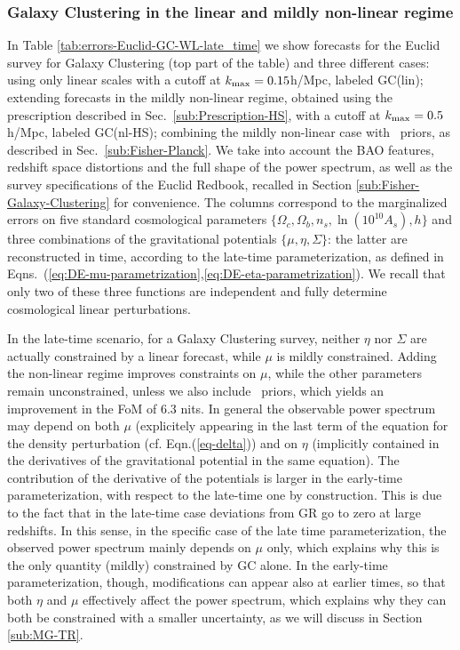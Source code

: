 \subsubsection{Galaxy Clustering in the linear and mildly non-linear regime}
In Table \ref{tab:errors-Euclid-GC-WL-late_time} we show forecasts for the Euclid survey \cite{laureijs_euclid_2011} for Galaxy Clustering (top part of the table) and three different cases: using only linear scales with a cutoff at $k_{\rm max}=0.15$h/Mpc, labeled GC(lin); extending forecasts in the mildly non-linear regime, obtained using the prescription described in Sec.\ \ref{sub:Prescription-HS}, with a cutoff at $k_{\rm max}=0.5$ h/Mpc, labeled GC(nl-HS); combining the mildly non-linear case with \planck\ priors, as described in Sec.\ \ref{sub:Fisher-Planck}. We take into account
the BAO features, redshift space distortions and the full shape of
the power spectrum, as well as the survey specifications of the Euclid Redbook, recalled
in Section \ref{sub:Fisher-Galaxy-Clustering} for convenience. The columns correspond to the marginalized errors on five standard cosmological parameters $\{\Omega_c, \Omega_b, n_s, \ln (10^{10} A_s), h\}$ and three combinations of the gravitational potentials $\{\mu, \eta, \Sigma\}$: the latter are reconstructed in time, according to the late-time parameterization, as defined in Eqns.\ (\ref{eq:DE-mu-parametrization},\ref{eq:DE-eta-parametrization}). We recall that only two of these three functions are independent and fully determine cosmological linear perturbations.

In the late-time scenario, for a Galaxy Clustering survey,  
neither $\eta$ nor $\Sigma$ are actually
constrained by a linear forecast, while $\mu$ is mildly constrained.  
Adding the non-linear regime improves constraints on $\mu$, while the other parameters remain unconstrained, 
unless we also include \planck\ priors, which yields an improvement in the FoM of 6.3 nits. In general the observable power spectrum may depend on both $\mu$ (explicitely appearing in the last term of the equation for the density perturbation (cf. Eqn.(\ref{eq-delta})) and on $\eta$ (implicitly contained in the derivatives of the gravitational potential in the same equation). The contribution of the derivative of the potentials is larger in the early-time parameterization, with respect to the late-time one by construction. This is due to the fact that in the late-time case deviations from GR go to zero at large redshifts. In this sense, in the specific case of the late time parameterization, the observed power spectrum mainly depends on $\mu$ only, which explains why this is the only quantity (mildly) constrained by GC alone. In the early-time parameterization, though, modifications can appear also at earlier times, so that both $\eta$ and $\mu$ effectively affect the power spectrum, which explains why they can both be constrained with a smaller uncertainty, as we will discuss in Section \ref{sub:MG-TR}.

